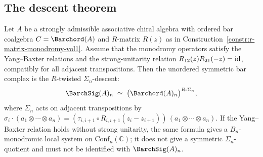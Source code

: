 \subsection*{The descent theorem}

\begin{proposition}
\ClaimStatusProvedHere
\label{prop:r-matrix-descent-vol1}
Let $A$ be a strongly admissible associative chiral algebra with
ordered bar coalgebra $C=\Barchord(A)$ and
$R$-matrix $R(z)$ as in
Construction~\textup{\ref{constr:r-matrix-monodromy-vol1}}.
Assume that the monodromy operators satisfy the Yang--Baxter
relations and the strong-unitarity relation
$R_{12}(z)R_{21}(-z)=\mathrm{id}$, compatibly for all adjacent
transpositions. Then the unordered symmetric bar complex is the
$R$-twisted $\Sigma_n$-descent:
\begin{equation}\label{eq:descent-identification-vol1}
\BarchSig(A)_n
\;\simeq\;
\bigl(\Barchord(A)_n\bigr)^{R\text{-}\Sigma_n},
\end{equation}
where $\Sigma_n$ acts on adjacent transpositions by
$\sigma_i\cdot(a_1\otimes\cdots\otimes a_n)
=(\tau_{i,i+1}\circ R_{i,i+1}(z_i{-}z_{i+1}))\,
(a_1\otimes\cdots\otimes a_n)$.
If the Yang--Baxter relation holds without strong unitarity, the same
formula gives a $B_n$-monodromic local system on
$\mathrm{Conf}_n(\mathbb C)$; it does not give a symmetric
$\Sigma_n$-quotient and must not be identified with $\BarchSig(A)_n$.
\end{proposition}

